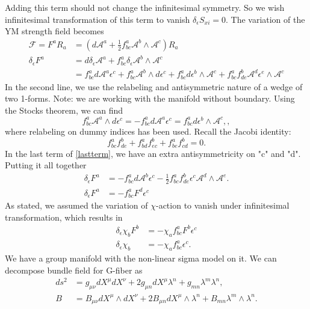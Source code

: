 \documentclass[a4paper]{article}
\begin{document}
 Adding this term should not change the infinitesimal symmetry. So we wish infinitesimal transformation of this term to vanish $\delta_{\epsilon} S_{xi} =0$. The variation of the YM strength field becomes
\begin{align}
 \mathcal{F} = F^{a} R_{a} &= ( d \mathcal{A}^{a} +\frac{1}{2} f^{a}_{b c}  \mathcal{A}^{b} \wedge \mathcal{A}^{c} ) R_{a}
 \\
 \delta_\epsilon F^a &= d \delta_{\epsilon} \mathcal{A}^a + f^{a}_{b c} \delta _{\epsilon} \mathcal{A}^b \wedge \mathcal{A}^c 
 \\	 \label{lastterm}
 &= f^{a}_{b c} d\mathcal{A}^a \epsilon^c + f^{a}_{b c} \mathcal{A}^{b} \wedge d \epsilon^c +f^{a}_{b c}  d \epsilon^b \wedge \mathcal{A}^{c} + f^{a}_{b c} f^{b}_{d e} \mathcal{A}^{d} \epsilon^{e} \wedge \mathcal{A}^{c}
\end{align}  
In the second line, we use the relabeling and antisymmetric nature of a wedge of two 1-forms. Note: we are working with the manifold without boundary. Using the Stocks theorem, we can find
\begin{equation}
f^{a}_{b c} \mathcal{A}^a \wedge d \epsilon^c = -f^{a}_{b c} d \mathcal{A}^a \epsilon^c =f^{a}_{b c}  d \epsilon^b \wedge \mathcal{A}^c,,
\end{equation}
where relabeling on dummy indices has been used. Recall the Jacobi identity:
\begin{equation}
f^a _{b c} f^{b} _{d e} +f^a _{b d} f^{b} _{e c} +f^a _{b e} f^{b} _{c d} =0.
\end{equation}
In the last term of \eqref{lastterm}, we have an extra antisymmetricity on "c" and "d". Putting it all together
\begin{align}
\delta_{\epsilon} F^a &= -f^a_{b c} d \mathcal{A}^b \epsilon^c - \frac{1}{2} f^a_{b c} f^b_{d e} \epsilon^c \mathcal{A}^d \wedge \mathcal{A}^e.
\\
\delta_{\epsilon} F^a &= -f^{a}_{b c} F^d \epsilon^c
\end{align}
As stated, we assumed the variation of $\chi$-action to vanish under infinitesimal transformation, which results in
\begin{align}
\delta_{\epsilon} \chi_{b} F^b &= - \chi_a f^a_{b c} F^b \epsilon^c
\\
\delta_{\epsilon} \chi_{b} &= -\chi_{a} f^{a}_{b c} \epsilon^{c}.
\end{align}
We have a group manifold with the non-linear sigma model on it. We can decompose bundle field for G-fiber as
\begin{align}
ds^2 &= g_{\mu \nu} d X^{\mu} dX^{\nu} + 2 g_{\mu n} d X^{\mu} \lambda^n + g_{m n} \lambda^{m} \lambda^{n},
\\
B &=   B_{\mu \nu} d X^{\mu} \wedge dX^{\nu} + 2 B_{\mu n} d X^{\mu} \wedge \lambda^n + B_{m n} \lambda^{m} \wedge \lambda^{n}.
\end{align}
\end{document}

